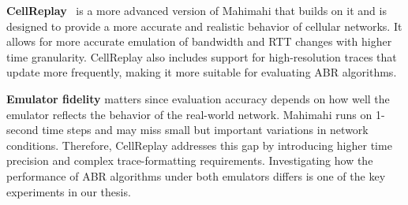 \textbf{CellReplay}~\cite{cellreplay-nsdi25} is a more advanced version of Mahimahi that builds on it and is designed to provide a more accurate and realistic behavior of cellular networks. It allows for more accurate emulation of bandwidth and RTT changes with higher time granularity. CellReplay also includes support for high-resolution traces that update more frequently, making it more suitable for evaluating ABR algorithms.

\textbf{Emulator fidelity} matters since evaluation accuracy depends on how well the emulator reflects the behavior of the real-world network. Mahimahi runs on 1-second time steps and may miss small but important variations in network conditions. Therefore, CellReplay addresses this gap by introducing higher time precision and complex trace-formatting requirements. Investigating how the performance of ABR algorithms under both emulators differs is one of the key experiments in our thesis.

